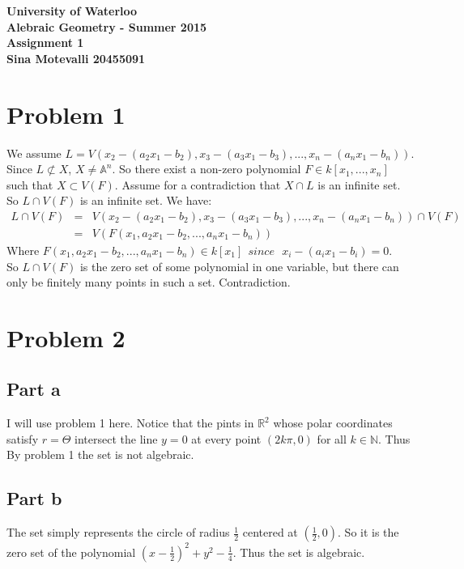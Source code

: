 \documentclass[12pt]{article}
\begin{document}
\begin{center}
  {\Large\bf University of Waterloo}\\
  \vspace{3mm}
         {\Large\bf Alebraic Geometry - Summer 2015}\\
         \vspace{2mm}
                {\Large\bf Assignment 1}\\
                \vspace{3mm}
                \textbf{Sina Motevalli 20455091}
\end{center}
\section*{Problem 1}
We assume $L=V(x_2-(a_2x_1-b_2),x_3-(a_3x_1-b_3),...,x_n-(a_nx_1-b_n))$.
Since $L \not\subset X$, $X \not= \mathbb{A}^n$. So there exist a non-zero polynomial $F \in k[x_1,...,x_n]$ such that $X \subset V(F)$. Assume for a contradiction that $X \cap L$ is an infinite set. So $L \cap V(F)$ is an infinite set. We have:
\begin{eqnarray*}
L \cap V(F) &=&
V(x_2-(a_2x_1-b_2),x_3-(a_3x_1-b_3),...,x_n-(a_nx_1-b_n)) \cap V(F)
\\ &=&
V(F(x_1,a_2x_1-b_2,...,a_nx_1-b_n)) 
\end{eqnarray*}  
Where $F(x_1,a_2x_1-b_2,...,a_nx_1-b_n) \in k[x_1]  \ \ since \ \ \ x_i-(a_ix_1-b_i)=0$. \\
So $L \cap V(F)$ is the zero set of some polynomial in one variable, but there can only be finitely many points in such a set. Contradiction.

\clearpage
\section*{Problem 2}
\subsection*{Part a}
I will use problem 1 here. Notice that the pints in $\mathbb{R}^2$ whose polar coordinates satisfy $r=\Theta$ intersect the line $y=0$ at every point $(2k\pi, 0)$ for all $k \in \mathbb{N}$. Thus By problem 1 the set is not algebraic.
\subsection*{Part b}
The set simply represents the circle of radius $\frac{1}{2}$ centered at $(\frac{1}{2},0)$. So it is the zero set of the polynomial $(x-\frac{1}{2})^2+y^2-\frac{1}{4}$. Thus the set is algebraic.
\end{document}
